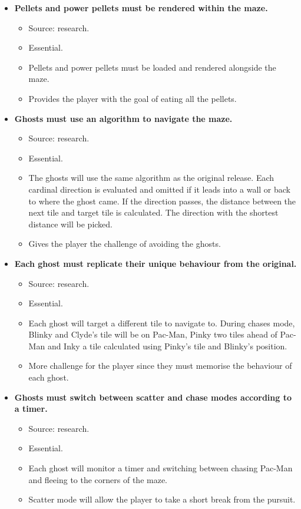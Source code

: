 \documentclass[letterpaper, 11pt]{article}
\begin{document}
\begin{itemize}
\item \textbf{Pellets and power pellets must be rendered within the maze.}
\begin{itemize}
\item Source: research.
\item Essential.
\item Pellets and power pellets must be loaded and rendered alongside the maze.
\item Provides the player with the goal of eating all the pellets.
\end{itemize}
\end{itemize}


\begin{itemize}
\item \textbf{Ghosts must use an algorithm to navigate the maze.}
\begin{itemize}
\item Source: research.
\item Essential.
\item The ghosts will use the same algorithm as the original release.
Each cardinal direction is evaluated and omitted if it leads into a wall or back to where the ghost came.
If the direction passes, the distance between the next tile and target tile is calculated.
The direction with the shortest distance will be picked.
\item Gives the player the challenge of avoiding the ghosts.
\end{itemize}
\end{itemize}


\begin{itemize}
\item \textbf{Each ghost must replicate their unique behaviour from the original.}
\begin{itemize}
\item Source: research.
\item Essential.
\item Each ghost will target a different tile to navigate to.
During chases mode, Blinky and Clyde’s tile will be on Pac-Man, Pinky two tiles ahead of Pac-Man and Inky a tile calculated using Pinky’s tile and Blinky’s position.
\item More challenge for the player since they must memorise the behaviour of each ghost.
\end{itemize}
\end{itemize}


\begin{itemize}
\item \textbf{Ghosts must switch between scatter and chase modes according to a timer.}
\begin{itemize}
\item Source: research.
\item Essential.
\item Each ghost will monitor a timer and switching between chasing Pac-Man and fleeing to the corners of the maze.
\item Scatter mode will allow the player to take a short break from the pursuit.
\end{itemize}
\end{itemize}
\end{document}
